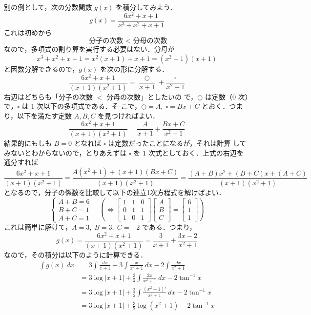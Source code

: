 \documentclass[10pt, uplatex, dvipdfmx]{jsarticle}
\theoremstyle{definition}
\numberwithin{equation}{section}
\begin{document}
別の例として，次の分数関数 $g(x)$ を積分してみよう．
\[
  g(x) = \frac{6x^2+x+1}{x^3+x^2+x+1}
\]
これは初めから
\[
  \text{ 分子の次数 } < \text{ 分母の次数}
\]
なので，多項式の割り算を実行する必要はない．分母が
\[
  x^3+x^2+x+1 = x^2(x+1) + x+1 = (x^2+1)(x+1)
\]
と因数分解できるので，$g(x)$ を次の形に分解する．
\[
  \frac{6x^2+x+1}{(x+1)(x^2+1)} = \frac{\bigcirc}{x+1} + \frac{\square}{x^2+1}
\]
右辺はどちらも「分子の次数 $<$ 分母の次数」としたいの
で，$\bigcirc$ は定数（$0$ 次）で，$\square$ は $1$ 次以下の多項式である．そ
こで，$\bigcirc = A, \; \square = Bx+C$ とおく．つまり，以下を満たす定数 $A,B,C$ を見つければよい．
\[
  \frac{6x^2+x+1}{(x+1)(x^2+1)} = \frac{A}{x+1} + \frac{Bx+C}{x^2+1}
\]
結果的にもしも $B=0$ となれば $\square$ は定数だったことになるが，それは計算
してみないとわからないので，とりあえずは $\square$ を $1$ 次式としておく．上式の右辺を通分すれば
\[
  \frac{6x^2+x+1}{(x+1)(x^2+1)} = \frac{A(x^2+1) +
    (x+1)(Bx+C)}{(x+1)(x^2+1)} = \frac{(A+B)x^2 + (B+C)x +
    (A+C)}{(x+1)(x^2+1)}
\]
となるので，分子の係数を比較して以下の連立1次方程式を解けばよい．
\[
  \begin{cases}
    A+B=6\\
    B+C=1\\
    A+C=1
  \end{cases} \quad \left( \Longleftrightarrow \left[
      \begin{array}{rrr}
        1 & 1 & 0\\
        0 & 1 & 1\\
        1 & 0 & 1
      \end{array}
    \right]\left[
      \begin{array}{r}
        A\\
        B\\
        C
      \end{array}
    \right] = \left[
      \begin{array}{r}
        6\\
        1\\
        1
      \end{array}
    \right]
  \right)
\]
これは簡単に解けて，$A=3, \; B=3, \; C=-2$ である．つまり，
\[
  g(x) = \frac{6x^2+x+1}{(x+1)(x^2+1)} = \frac{3}{x+1} + \frac{3x-2}{x^2+1}
\]
なので，その積分は以下のように計算できる．
\[
  \begin{aligned}
    \int g(x) \ dx
    &= 3\int \frac{dx}{x+1} + 3\int \frac{x}{x^2+1} \ dx - 2 \int \frac{dx}{x^2+1}\\[1ex]
    &  =3\log|x+1| + \frac{3}{2}\int \frac{2x}{x^2+1}\ dx - 2 \tan^{-1}x\\[1ex]
    &= 3\log|x+1| + \frac{3}{2} \int \frac{(x^2+1)'}{x^2+1}\ dx - 2\tan^{-1}x\\[1ex]
    &  =3 \log|x+1| + \frac{3}{2} \log(x^2+1) -2\tan^{-1}x 
  \end{aligned}
\]
\end{document}
